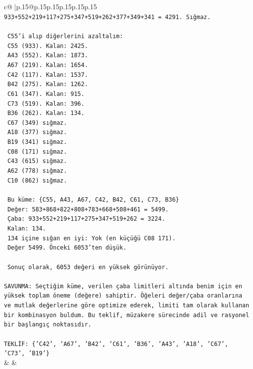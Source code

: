 \documentclass{article}
\begin{document}
{\begin{supertabular}{c@{$\;$}|p{.15\linewidth}@{}p{.15\linewidth}p{.15\linewidth}p{.15\linewidth}p{.15\linewidth}p{.15\linewidth}}
{{{\texttt{   933+552+219+117+275+347+519+262+377+349+341 = 4291. Sığmaz.} \\
\\ 
\texttt{   C55'i alıp diğerlerini azaltalım:} \\
\texttt{   C55 (933). Kalan: 2425.} \\
\texttt{   A43 (552). Kalan: 1873.} \\
\texttt{   A67 (219). Kalan: 1654.} \\
\texttt{   C42 (117). Kalan: 1537.} \\
\texttt{   B42 (275). Kalan: 1262.} \\
\texttt{   C61 (347). Kalan: 915.} \\
\texttt{   C73 (519). Kalan: 396.} \\
\texttt{   B36 (262). Kalan: 134.} \\
\texttt{   C67 (349) sığmaz.} \\
\texttt{   A18 (377) sığmaz.} \\
\texttt{   B19 (341) sığmaz.} \\
\texttt{   C08 (171) sığmaz.} \\
\texttt{   C43 (615) sığmaz.} \\
\texttt{   A62 (778) sığmaz.} \\
\texttt{   C10 (862) sığmaz.} \\
\\ 
\texttt{   Bu küme: \{C55, A43, A67, C42, B42, C61, C73, B36\}} \\
\texttt{   Değer: 583+868+822+808+783+668+508+461 = 5499.} \\
\texttt{   Çaba: 933+552+219+117+275+347+519+262 = 3224.} \\
\texttt{   Kalan: 134.} \\
\texttt{   134 içine sığan en iyi: Yok (en küçüğü C08 171).} \\
\texttt{   Değer 5499. Önceki 6053'ten düşük.} \\
\\ 
\texttt{   Sonuç olarak, 6053 değeri en yüksek görünüyor.} \\
\\ 
\texttt{SAVUNMA: Seçtiğim küme, verilen çaba limitleri altında benim için en yüksek toplam öneme (değere) sahiptir. Öğeleri değer/çaba oranlarına ve mutlak değerlerine göre optimize ederek, limiti tam olarak kullanan bir kombinasyon buldum. Bu teklif, müzakere sürecinde adil ve rasyonel bir başlangıç noktasıdır.} \\
\\ 
\texttt{TEKLİF: \{'C42', 'A67', 'B42', 'C61', 'B36', 'A43', 'A18', 'C67', 'C73', 'B19'\}} \\
            }
        }
    }
    & & \\ \\


\end{supertabular}}
\end{document}
